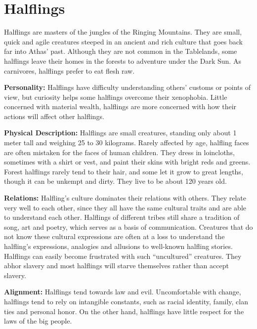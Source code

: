 \section{Halflings}

Halflings are masters of the jungles of the Ringing Mountains. They are small, quick and agile creatures steeped in an ancient and rich culture that goes back far into Athas' past. Although they are not common in the Tablelands, some halflings leave their homes in the forests to adventure under the {\tableheader Dark Sun}. As carnivores, halflings prefer to eat flesh raw.

\textbf{Personality:} Halflings have difficulty understanding others' customs or points of view, but curiosity helps some halflings overcome their xenophobia. Little concerned with material wealth, halflings are more concerned with how their actions will affect other halflings.

\textbf{Physical Description:} Halflings are small creatures, standing only about 1 meter tall and weighing 25 to 30 kilograms. Rarely affected by age, halfling faces are often mistaken for the faces of human children. They dress in loincloths, sometimes with a shirt or vest, and paint their skins with bright reds and greens. Forest halflings rarely tend to their hair, and some let it grow to great lengths, though it can be unkempt and dirty. They live to be about 120 years old.

\textbf{Relations:} Halfling's culture dominates their relations with others. They relate very well to each other, since they all have the same cultural traits and are able to understand each other. Halflings of different tribes still share a tradition of song, art and poetry, which serves as a basis of communication. Creatures that do not know these cultural expressions are often at a loss to understand the halfling's expressions, analogies and allusions to well-known halfling stories. Halflings can easily become frustrated with such ``uncultured'' creatures. They abhor slavery and most halflings will starve themselves rather than accept slavery.

\textbf{Alignment:} Halflings tend towards law and evil. Uncomfortable with change, halflings tend to rely on intangible constants, such as racial identity, family, clan ties and personal honor. On the other hand, halflings have little respect for the laws of the big people.

